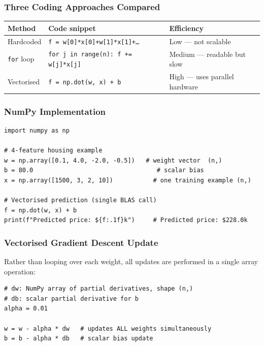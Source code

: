 \subsubsection{Three Coding Approaches Compared}

\begin{center}
\begin{tabular}{lll}
\toprule
\textbf{Method} & \textbf{Code snippet} & \textbf{Efficiency}\\
\midrule
Hardcoded      & \texttt{f = w[0]*x[0]+w[1]*x[1]+\ldots}  & Low — not scalable\\[2pt]
\texttt{for} loop & \texttt{for j in range(n): f += w[j]*x[j]} & Medium — readable but slow\\[2pt]
Vectorised     & \texttt{f = np.dot(w, x) + b}             & High — uses parallel hardware\\
\bottomrule
\end{tabular}
\end{center}

\subsubsection{NumPy Implementation}

\begin{lstlisting}[caption={Computing a prediction with NumPy}]
import numpy as np

# 4-feature housing example
w = np.array([0.1, 4.0, -2.0, -0.5])   # weight vector  (n,)
b = 80.0                                  # scalar bias
x = np.array([1500, 3, 2, 10])           # one training example (n,)

# Vectorised prediction (single BLAS call)
f = np.dot(w, x) + b
print(f"Predicted price: ${f:.1f}k")     # Predicted price: $228.0k
\end{lstlisting}

\subsubsection{Vectorised Gradient Descent Update}

Rather than looping over each weight, all updates are performed in a single
array operation:
\begin{lstlisting}[caption={Vectorised parameter update}]
# dw: NumPy array of partial derivatives, shape (n,)
# db: scalar partial derivative for b
alpha = 0.01

w = w - alpha * dw   # updates ALL weights simultaneously
b = b - alpha * db   # scalar bias update
\end{lstlisting}

